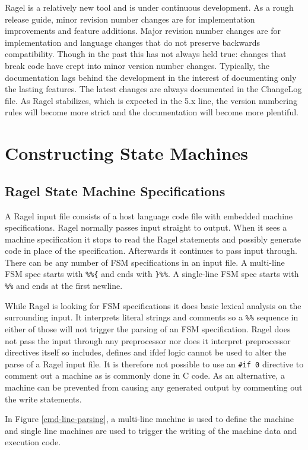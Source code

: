 \documentclass[letterpaper,11pt,oneside]{book}
\begin{document}
Ragel is a relatively new tool and is under continuous development. As a rough
release guide, minor revision number changes are for implementation
improvements and feature additions. Major revision number changes are for
implementation and language changes that do not preserve backwards
compatibility. Though in the past this has not always held true: changes that
break code have crept into minor version number changes. Typically, the
documentation lags behind the development in the interest of documenting only
the lasting features. The latest changes are always documented in the ChangeLog
file. As Ragel stabilizes, which is expected in the 5.x line, the version
numbering rules will become more strict and the documentation will become more
plentiful.


\chapter{Constructing State Machines}

\section{Ragel State Machine Specifications}

A Ragel input file consists of a host language code file with embedded machine
specifications.  Ragel normally passes input straight to output.  When it sees
a machine specification it stops to read the Ragel statements and possibly generate
code in place of the specification.
Afterwards it continues to pass input through.  There
can be any number of FSM specifications in an input file. A multi-line FSM spec
starts with \verb|%%{| and ends with \verb|}%%|. A single-line FSM spec starts
with \verb|%%| and ends at the first newline.  

While Ragel is looking for FSM specifications it does basic lexical analysis on
the surrounding input. It interprets literal strings and comments so a
\verb|%%| sequence in either of those will not trigger the parsing of an FSM
specification. Ragel does not pass the input through any preprocessor nor does it
interpret preprocessor directives itself so includes, defines and ifdef logic
cannot be used to alter the parse of a Ragel input file. It is therefore not
possible to use an \verb|#if 0| directive to comment out a machine as is
commonly done in C code. As an alternative, a machine can be prevented from
causing any generated output by commenting out the write statements.

In Figure \ref{cmd-line-parsing}, a multi-line machine is used to define the
machine and single line machines are used to trigger the writing of the machine
data and execution code.
\end{document}
